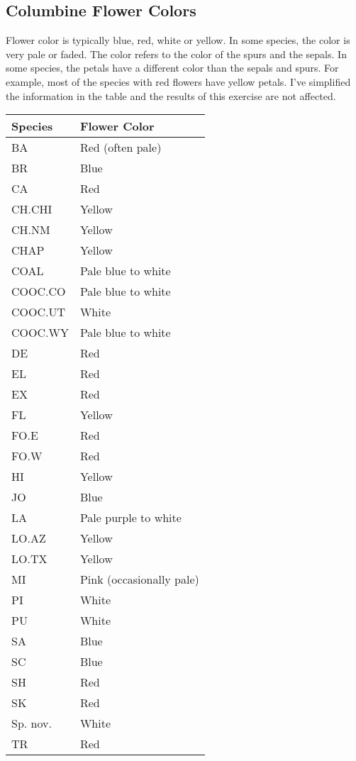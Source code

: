 \documentclass[11pt, addpoints]{exam}
\begin{document}
\subsection*{Columbine Flower Colors}

Flower color is typically blue, red, white or yellow. In some species,
the color is very pale or faded. The color refers to the color of the
spurs and the sepals. In some species, the petals have a different color
than the sepals and spurs. For example, most of the species with red
flowers have yellow petals. I've simplified the information in the table
and the results of this exercise are not affected.

\vspace{\baselineskip}

\begin{tabular}[c]{@{}ll@{}}
\toprule
Species & Flower Color\tabularnewline
\midrule
BA & Red (often pale)\tabularnewline
BR & Blue\tabularnewline
CA & Red\tabularnewline
CH.CHI & Yellow\tabularnewline
CH.NM & Yellow\tabularnewline
CHAP & Yellow\tabularnewline
COAL & Pale blue to white\tabularnewline
COOC.CO & Pale blue to white\tabularnewline
COOC.UT & White\tabularnewline
COOC.WY & Pale blue to white\tabularnewline
DE & Red\tabularnewline
EL & Red\tabularnewline
EX & Red\tabularnewline
FL & Yellow\tabularnewline
FO.E & Red\tabularnewline
FO.W & Red\tabularnewline
HI & Yellow\tabularnewline
JO & Blue\tabularnewline
LA & Pale purple to white\tabularnewline
LO.AZ & Yellow\tabularnewline
LO.TX & Yellow\tabularnewline
MI & Pink (occasionally pale)\tabularnewline
PI & White\tabularnewline
PU & White\tabularnewline
SA & Blue\tabularnewline
SC & Blue\tabularnewline
SH & Red\tabularnewline
SK & Red\tabularnewline
Sp. nov.\footnotemark & White\tabularnewline
TR & Red\tabularnewline
\bottomrule
\end{tabular}

\end{document}
